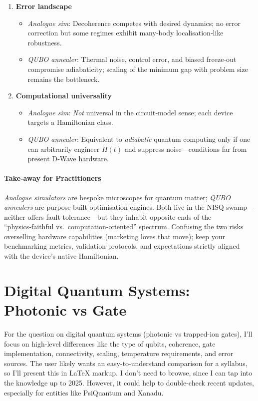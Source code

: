 \documentclass[11pt,a4paper]{article}
\begin{document}
\begin{enumerate}
	\item \textbf{Error landscape}  
	\begin{itemize}
		\item \emph{Analogue sim}: Decoherence competes with desired dynamics; no error correction but some regimes exhibit many‑body localisation‐like robustness.  
		\item \emph{QUBO annealer}: Thermal noise, control error, and biased freeze‑out compromise adiabaticity; scaling of the minimum gap with problem size remains the bottleneck.
	\end{itemize}
	
	\item \textbf{Computational universality}  
	\begin{itemize}
		\item \emph{Analogue sim}: \emph{Not} universal in the circuit‑model sense; each device targets a Hamiltonian class.  
		\item \emph{QUBO annealer}: Equivalent to \emph{adiabatic} quantum computing only if one can arbitrarily engineer $H(t)$ and suppress noise—conditions far from present D‑Wave hardware.
	\end{itemize}
\end{enumerate}

\paragraph{Take‑away for Practitioners}
\emph{Analogue simulators} are bespoke microscopes for quantum matter; \emph{QUBO annealers} are purpose‑built optimisation engines.  Both live in the NISQ swamp—neither offers fault tolerance—but they inhabit opposite ends of the “physics‑faithful vs.\ computation‑oriented” spectrum.  Confusing the two risks overselling hardware capabilities (marketing loves that move); keep your benchmarking metrics, validation protocols, and expectations strictly aligned with the device’s native Hamiltonian.

\section{Digital Quantum Systems: Photonic vs Gate}


For the question on digital quantum systems (photonic vs trapped-ion gates), I'll focus on high-level differences like the type of qubits, coherence, gate implementation, connectivity, scaling, temperature requirements, and error sources. The user likely wants an easy-to-understand comparison for a syllabus, so I'll present this in LaTeX markup. I don't need to browse, since I can tap into the knowledge up to 2025. However, it could help to double-check recent updates, especially for entities like PsiQuantum and Xanadu.
\end{document}
